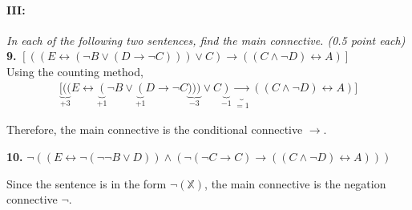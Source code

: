 \documentclass[a4paper,11pt]{article}
\theoremstyle{mytheor}
\let\biconditional\leftrightarrow
\begin{document}
\paragraph{III:} \textit{In each of the following two sentences, find the main connective. (0.5 point each)} \\[1em]
\noindent\textbf{9.} $[((E \biconditional (\neg B \lor (D \to \neg C))) \lor C) \to ((C \land \neg D) \biconditional A)]$ \\
Using the counting method,
\begin{align*}
    \underbrace{[((}_{+3}E \biconditional \underbrace{(}_{+1}\neg B \lor \underbrace{(}_{+1}D \to \neg C\underbrace{)))}_{-3} \lor C\underbrace{)}_{-1} \underbrace{\to}_{=1} ((C \land \neg D) \biconditional A)]
\end{align*}
\begin{framed}
\noindent Therefore, the main connective is the conditional connective ${\to}$.
\end{framed}

\noindent\textbf{10.} $\neg((E \biconditional \neg(\neg \neg B \lor D)) \land (\neg(\neg C \to C) \to ((C \land \neg D) \biconditional A)))$ 
\begin{framed}
\noindent Since the sentence is in the form $\neg(\mathbb{X})$, the main connective is the negation connective ${\neg}$.
\end{framed}
\end{document}
